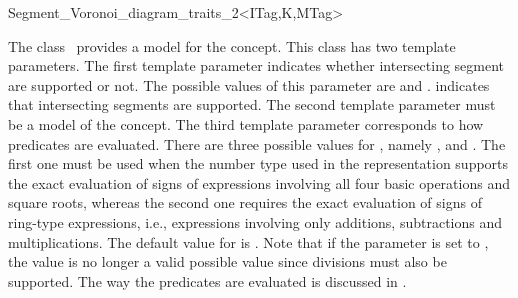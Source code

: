 


\begin{ccRefClass}{Segment_Voronoi_diagram_traits_2<ITag,K,MTag>}


\ccDefinition
  
The class \ccRefName\ provides a model for the
 concept.
This class has two template parameters. The first template parameter
indicates whether intersecting segment are supported or not. The
possible values of this parameter are  and
.  indicates that
intersecting segments are supported. The second template parameter
must be a model of the  concept. The third template
parameter corresponds to how predicates are evaluated. There are three
possible values for , namely
,  and
. The first one must be used when the number type
used in the representation supports the exact evaluation of signs of
expressions involving all four basic operations and square roots,
whereas the second one requires the exact evaluation of signs of
ring-type expressions, i.e., expressions involving only additions,
subtractions and multiplications. The default value for
 is . Note that if the parameter
 is set to , the value
 is no longer a valid possible value since
divisions must also be supported.
%
The way the predicates are evaluated is discussed in
\cite{b-ecvdl-96,k-peasv-04}.




\end{ccRefClass}

